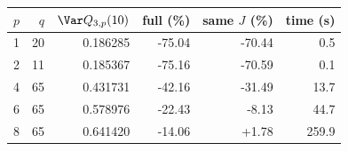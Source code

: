 \begin{tabular}{rrrrrr}\toprule
$p$ & $q$ & $\Var Q_{3,p}(10)$ & full (\%) & same $J$ (\%) & time (s)\\\midrule
1 & 20 & 0.186285 & -75.04 & -70.44 & 0.5\\
2 & 11 & 0.185367 & -75.16 & -70.59 & 0.1\\
4 & 65 & 0.431731 & -42.16 & -31.49 & 13.7\\
6 & 65 & 0.578976 & -22.43 & -8.13 & 44.7\\
8 & 65 & 0.641420 & -14.06 & +1.78 & 259.9\\
\bottomrule\end{tabular}
